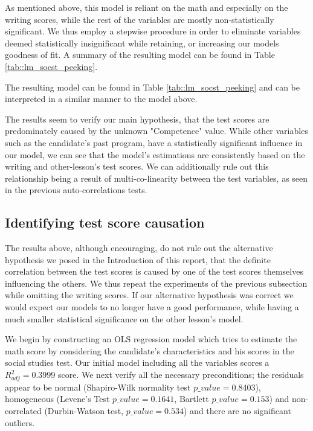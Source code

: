 \documentclass[10pt, a4paper]{article}
\begin{document}
	As mentioned above, this model is reliant on the math and especially on the writing scores, while the rest of the variables are mostly non-statistically significant. We thus employ a stepwise procedure in order to eliminate variables deemed statistically insignificant while retaining, or increasing our models goodness of fit. A summary of the resulting model can be found in Table \ref{tab::lm_socst_peeking}.
	
	The resulting model can be found in Table \ref{tab::lm_socst_peeking} and can be interpreted in a similar manner to the model above.
	
	The results seem to verify our main hypothesis, that the test scores are predominately caused by the unknown "Competence" value. While other variables such as the candidate's past program, have a statistically significant influence in our model, we can see that the model's estimations are consistently based on the writing and other-lesson's test scores. We can additionally rule out this relationship being a result of multi-co-linearity between the test variables, as seen in the previous auto-correlations tests.
	
	
	
	
	
	\subsection{Identifying test score causation}
	
	The results above, although encouraging, do not rule out the alternative hypothesis we posed in the Introduction of this report, that the definite correlation between the test scores is caused by one of the test scores themselves influencing the others. We thus repeat the experiments of the previous subsection while omitting the writing scores. If our alternative hypothesis was correct we would expect our models to no longer have a good performance, while having a much smaller statistical significance on the other lesson's model.
	
	We begin by constructing an OLS regression model which tries to estimate the math score by considering the candidate's characteristics and his scores in the social studies test. Our initial model including all the variables scores a $R^2_{adj} = 0.3999$ score. We next verify all the necessary preconditions; the residuals appear to be normal (Shapiro-Wilk normality test $p\_value = 0.8403$), homogeneous (Levene's Test $p\_value = 0.1641$, Bartlett $p\_value = 0.153$) and non-correlated (Durbin-Watson test, $p\_value=0.534$) and there are no significant outliers. 
	
\end{document}
